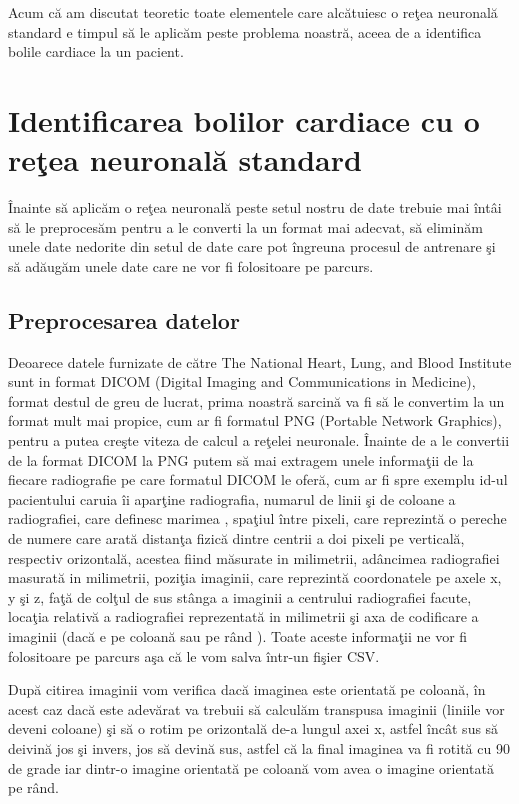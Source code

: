 \par

Acum c\u{a} am discutat teoretic toate elementele care alc\u{a}tuiesc o re\c{t}ea neuronal\u{a} standard e timpul s\u{a} le aplic\u{a}m peste problema noastr\u{a}, aceea de a identifica bolile cardiace la un pacient.

\section{Identificarea bolilor cardiace cu o re\c{t}ea neuronal\u{a} standard}

\^{I}nainte s\u{a} aplic\u{a}m o re\c{t}ea neuronal\u{a} peste setul nostru de date trebuie mai \^{i}nt\^{a}i s\u{a} le preproces\u{a}m pentru a le converti la un format mai adecvat, s\u{a} elimin\u{a}m unele date nedorite din setul de date care pot \^{i}ngreuna procesul de antrenare \c{s}i s\u{a} ad\u{a}ug\u{a}m unele date care ne vor fi folositoare pe parcurs.

\subsection{Preprocesarea datelor}

Deoarece datele furnizate de c\u{a}tre The National Heart, Lung, and Blood Institute sunt in format DICOM (Digital Imaging and Communications in Medicine), format destul de greu de lucrat, prima noastr\u{a} sarcin\u{a} va fi s\u{a} le convertim la un format mult mai propice, cum ar fi formatul PNG (Portable Network Graphics), pentru a putea cre\c{s}te viteza de calcul a re\c{t}elei neuronale. \^{I}nainte de a le convertii de la format DICOM la PNG putem s\u{a} mai extragem unele informa\c{t}ii de la fiecare radiografie pe care formatul DICOM le ofer\u{a}, cum ar fi spre exemplu  id-ul pacientului caruia \^{i}i apar\c{t}ine radiografia, numarul de linii \c{s}i de coloane a radiografiei, care definesc marimea , spa\c{t}iul \^{i}ntre pixeli, care reprezint\u{a} o pereche de numere care arat\u{a} distan\c{t}a fizic\u{a} dintre centrii a doi pixeli pe vertical\u{a}, respectiv orizontal\u{a}, acestea fiind m\u{a}surate in milimetrii, ad\^{a}ncimea radiografiei masurat\u{a} in milimetrii, pozi\c{t}ia imaginii, care reprezint\u{a} coordonatele pe axele x, y \c{s}i z, fa\c{t}\u{a} de col\c{t}ul de sus st\^{a}nga a imaginii a centrului  radiografiei facute, loca\c{t}ia relativ\u{a} a radiografiei reprezentat\u{a} in milimetrii \c{s}i axa de codificare a imaginii (dac\u{a} e pe coloan\u{a} sau pe r\^{a}nd ). Toate aceste informa\c{t}ii ne vor fi folositoare pe parcurs a\c{s}a c\u{a} le vom salva \^{i}ntr-un fi\c{s}ier CSV.

\par

Dup\u{a} citirea imaginii vom verifica dac\u{a} imaginea este orientat\u{a} pe coloan\u{a}, \^{i}n acest caz dac\u{a} este adev\u{a}rat  va trebuii s\u{a} calcul\u{a}m transpusa imaginii (liniile vor deveni coloane) \c{s}i s\u{a} o rotim pe orizontal\u{a} de-a lungul axei x, astfel \^{i}nc\^{a}t sus s\u{a} deivin\u{a} jos \c{s}i invers, jos s\u{a} devin\u{a} sus, astfel c\u{a} la final imaginea va fi rotit\u{a} cu 90 de grade iar dintr-o imagine orientat\u{a} pe coloan\u{a} vom avea o imagine orientat\u{a} pe r\^{a}nd.